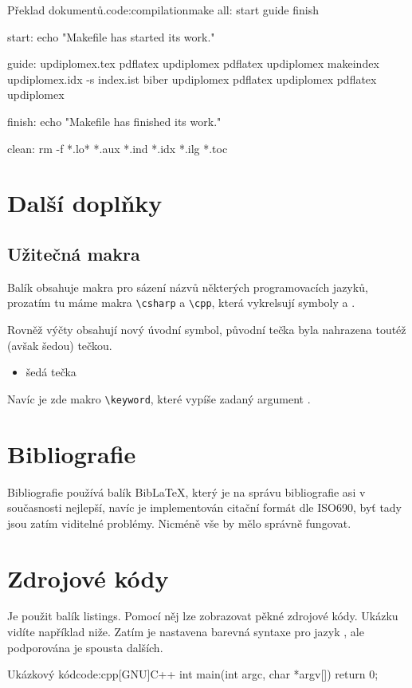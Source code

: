 \documentclass[a4paper,12pt]{article}
\begin{document}
\begin{upcode}{Překlad dokumentů.}{code:compilation}{make}
all: start guide finish

start:
	echo "Makefile has started its work."

guide:	updiplomex.tex
	pdflatex updiplomex
	pdflatex updiplomex
	makeindex updiplomex.idx -s index.ist
	biber updiplomex
	pdflatex updiplomex
	pdflatex updiplomex

finish:
	echo "Makefile has finished its work."

clean:
	rm -f *.lo* *.aux *.ind *.idx *.ilg *.toc
\end{upcode}

\section{Další doplňky}
\subsection{Užitečná makra}
Balík obsahuje makra pro sázení názvů některých programovacích jazyků, prozatím tu máme makra \verb|\csharp| a \verb|\cpp|, která vykrelsují symboly \csharp a \cpp.

Rovněž výčty obsahují nový úvodní symbol, původní tečka byla nahrazena toutéž (avšak šedou) tečkou.
\begin{itemize}
\item šedá tečka
\end{itemize}

Navíc je zde makro \verb|\keyword|, které vypíše zadaný argument .

\section{Bibliografie}
Bibliografie používá balík Bib\LaTeX, který je na správu bibliografie asi v současnosti nejlepší, navíc je implementován citační formát dle ISO690, byť tady jsou zatím viditelné problémy. Nicméně vše by mělo správně fungovat.

\section{Zdrojové kódy}
Je použit balík listings. Pomocí něj lze zobrazovat pěkné zdrojové kódy. Ukázku vidíte například niže. Zatím je nastavena barevná syntaxe pro jazyk \cpp, ale podporována je spousta dalších. 

\begin{upcode}{Ukázkový \cpp kód}{code:cpp}{[GNU]C++}
int main(int argc, char *argv[]) {
	return 0;
}
\end{upcode}
\end{document}
